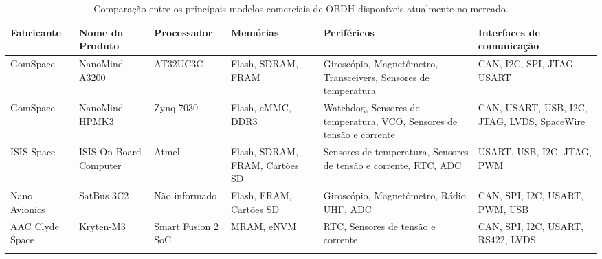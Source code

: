 \begin{table}[htb]
    \centering
	\ABNTEXfontereduzida
	\caption{\label{tab:Tab_Rev}Comparação entre os principais modelos comerciais de OBDH disponíveis atualmente no mercado.}
    \begin{tabular}{@{}p{2cm}p{2.6cm}p{2cm}p{2cm}p{2.2cm}p{2.6cm}@{}}
		\toprule
		\textbf{Fabricante} & \textbf{Nome do Produto} & \textbf{Processador} & \textbf{Memórias} & \textbf{Periféricos} & \textbf{Interfaces de comunicação} \\ 
        \midrule
        GomSpace & NanoMind A3200 & AT32UC3C & Flash, SDRAM, FRAM & Giroscópio, Magnetômetro, Transceivers, Sensores de temperatura & CAN, I2C, SPI, JTAG, USART \\%
        
        \midrule
        GomSpace & NanoMind HPMK3 & Zynq 7030 & Flash, eMMC, DDR3 & Watchdog, Sensores de temperatura, VCO, Sensores de tensão e corrente & CAN, USART, USB, I2C, JTAG, LVDS, SpaceWire \\ %

        \midrule
        ISIS Space & ISIS On Board Computer & Atmel & Flash, SDRAM, FRAM, Cartões SD & Sensores de temperatura, Sensores de tensão e corrente, RTC, ADC & USART, USB, I2C, JTAG, PWM \\ %

        \midrule
        Nano Avionics & SatBus 3C2 & Não informado & Flash, FRAM, Cartões SD & Giroscópio, Magnetômetro, Rádio UHF, ADC & CAN, SPI, I2C, USART, PWM, USB \\ %

        \midrule
        AAC Clyde Space & Kryten-M3 & Smart Fusion 2 SoC & MRAM, eNVM & RTC, Sensores de tensão e corrente & CAN, SPI, I2C, USART, RS422, LVDS \\ %


		
        \\ \bottomrule
	\end{tabular}
\end{table}

